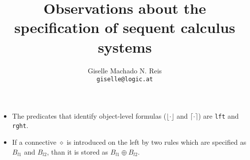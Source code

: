 \documentclass[a4paper, 11pt]{article}
\title{Observations about the specification of sequent calculus systems}
\author{Giselle Machado N. Reis \\ \texttt{giselle@logic.at}}
\begin{document}
\maketitle

\begin{itemize}
    \item The predicates that identify object-level formulas ($\lfloor \cdot
    \rfloor$ and $\lceil \cdot \rceil$) are \texttt{lft} and \texttt{rght}.
    \item If a connective $\diamond$ is introduced on the left by two rules which are
    specified as $B_{l1}$ and $B_{l2}$, than it is stored as $B_{l1}
    \oplus B_{l2}$.
\end{itemize}
\end{document}
